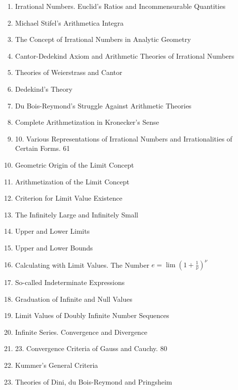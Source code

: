 \begin{enumerate}[itemsep=0pt]
    \item Irrational Numbers. Euclid's Ratios and Incommensurable Quantities
    \item Michael Stifel's Arithmetica Integra
    \item The Concept of Irrational Numbers in Analytic Geometry
    \item Cantor-Dedekind Axiom and Arithmetic Theories of Irrational Numbers
    \item Theories of Weierstrass and Cantor
    \item Dedekind's Theory
    \item Du Bois-Reymond's Struggle Against Arithmetic Theories
    \item Complete Arithmetization in Kronecker's Sense
    \item 10. Various Representations of Irrational Numbers and Irrationalities of Certain Forms. 61
    \setcounter{enumi}{10}
    \item Geometric Origin of the Limit Concept
    \item Arithmetization of the Limit Concept
    \item Criterion for Limit Value Existence
    \item The Infinitely Large and Infinitely Small
    \item Upper and Lower Limits
    \item Upper and Lower Bounds
    \item Calculating with Limit Values. The Number $e = \lim(1 + \frac{1}{\nu})^{\nu}$ 
    \item So-called Indeterminate Expressions
    \item Graduation of Infinite and Null Values
    \item Limit Values of Doubly Infinite Number Sequences
    \item Infinite Series. Convergence and Divergence
    \item 23. Convergence Criteria of Gauss and Cauchy. 80
    \setcounter{enumi}{23}
    \item Kummer's General Criteria
    \item Theories of Dini, du Bois-Reymond and Pringsheim

\end{enumerate}
